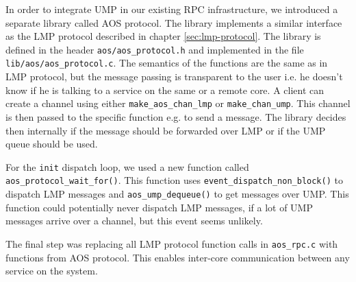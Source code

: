 In order to integrate UMP in our existing RPC infrastructure, we introduced a separate
library called AOS protocol. The library implements a similar interface as the LMP protocol
described in chapter \ref{sec:lmp-protocol}. The library is defined in the header 
\verb|aos/aos_protocol.h| and implemented in the file \verb|lib/aos/aos_protocol.c|. The semantics
of the functions are the same as in LMP protocol, but the message passing is transparent to the user
i.e. he doesn't know if he is talking to a service on the same or a remote core. A client can create
a channel using either \verb|make_aos_chan_lmp| or \verb|make_chan_ump|. This channel is then passed
to the specific function e.g. to send a message. The library decides then internally if the message
should be forwarded over LMP or if the UMP queue should be used.

For the \verb|init| dispatch loop, we used a new function called \newline
\verb|aos_protocol_wait_for()|. This
function uses \verb|event_dispatch_non_block()| to dispatch LMP messages and \verb|aos_ump_dequeue()|
to get messages over UMP. This function could potentially never dispatch LMP messages, if a lot of UMP
messages arrive over a channel, but this event seems unlikely.

The final step was replacing all LMP protocol function calls in \verb|aos_rpc.c| with functions from
AOS protocol. This enables inter-core communication between any service on the system.

